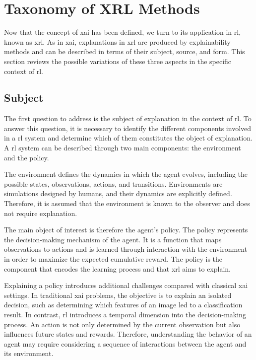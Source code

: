 \section{Taxonomy of XRL Methods}
\label{sec:taxonomy_xrl_methods}

Now that the concept of \gls{xai} has been defined, we turn to its application in \gls{rl}, known as \gls{xrl}.
As in \gls{xai}, explanations in \gls{xrl} are produced by explainability methods and can be described in terms of their subject, source, and form.
This section reviews the possible variations of these three aspects in the specific context of \gls{rl}.

\subsection{Subject}
\label{subsec:subject}

The first question to address is the subject of explanation in the context of \gls{rl}.
To answer this question, it is necessary to identify the different components involved in a \gls{rl} system and determine which of them constitutes the object of explanation.
A \gls{rl} system can be described through two main components: the environment and the policy.

The environment defines the dynamics in which the agent evolves, including the possible states, observations, actions, and transitions.
Environments are simulations designed by humans, and their dynamics are explicitly defined.
Therefore, it is assumed that the environment is known to the observer and does not require explanation.

The main object of interest is therefore the agent's policy.
The policy represents the decision-making mechanism of the agent.
It is a function that maps observations to actions and is learned through interaction with the environment in order to maximize the expected cumulative reward.
The policy is the component that encodes the learning process and that \gls{xrl} aims to explain.

Explaining a policy introduces additional challenges compared with classical \gls{xai} settings.
In traditional \gls{xai} problems, the objective is to explain an isolated decision, such as determining which features of an image led to a classification result.
In contrast, \gls{rl} introduces a temporal dimension into the decision-making process.
An action is not only determined by the current observation but also influences future states and rewards.
Therefore, understanding the behavior of an agent may require considering a sequence of interactions between the agent and its environment.

